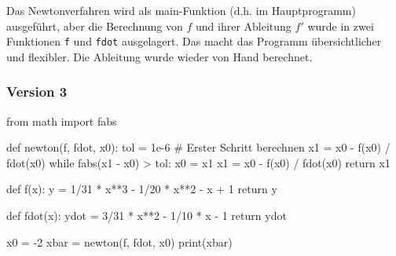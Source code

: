 \documentclass[
  letterpaper,
  DIV=11,
  oneside]{scrreprt}
\newenvironment{Shaded}{\begin{snugshade}}{\end{snugshade}}
\newcommand{\BuiltInTok}[1]{\textcolor[rgb]{0.00,0.23,0.31}{#1}}
\newcommand{\CommentTok}[1]{\textcolor[rgb]{0.37,0.37,0.37}{#1}}
\newcommand{\ControlFlowTok}[1]{\textcolor[rgb]{0.00,0.23,0.31}{#1}}
\newcommand{\DecValTok}[1]{\textcolor[rgb]{0.68,0.00,0.00}{#1}}
\newcommand{\FloatTok}[1]{\textcolor[rgb]{0.68,0.00,0.00}{#1}}
\newcommand{\ImportTok}[1]{\textcolor[rgb]{0.00,0.46,0.62}{#1}}
\newcommand{\KeywordTok}[1]{\textcolor[rgb]{0.00,0.23,0.31}{#1}}
\newcommand{\NormalTok}[1]{\textcolor[rgb]{0.00,0.23,0.31}{#1}}
\newcommand{\OperatorTok}[1]{\textcolor[rgb]{0.37,0.37,0.37}{#1}}
\theoremstyle{definition}
\theoremstyle{definition}
\theoremstyle{remark}
\begin{document}
\begin{tcolorbox}
Das Newtonverfahren wird als main-Funktion (d.h. im Hauptprogramm)
ausgeführt, aber die Berechnung von \(f\) und ihrer Ableitung \(f'\)
wurde in zwei Funktionen \texttt{f} und \texttt{fdot} ausgelagert. Das
macht das Programm übersichtlicher und flexibler. Die Ableitung wurde
wieder von Hand berechnet.

\hypertarget{version-3}{%
\subsubsection{Version 3}\label{version-3}}

\begin{Shaded}
\begin{Highlighting}[]
\ImportTok{from}\NormalTok{ math }\ImportTok{import}\NormalTok{ fabs}

\KeywordTok{def}\NormalTok{ newton(f, fdot, x0):}
\NormalTok{    tol }\OperatorTok{=} \FloatTok{1e{-}6}
    \CommentTok{\# Erster Schritt berechnen}
\NormalTok{    x1 }\OperatorTok{=}\NormalTok{ x0 }\OperatorTok{{-}}\NormalTok{ f(x0) }\OperatorTok{/}\NormalTok{ fdot(x0)}
    \ControlFlowTok{while}\NormalTok{ fabs(x1 }\OperatorTok{{-}}\NormalTok{ x0) }\OperatorTok{\textgreater{}}\NormalTok{ tol:}
\NormalTok{        x0 }\OperatorTok{=}\NormalTok{ x1}
\NormalTok{        x1 }\OperatorTok{=}\NormalTok{ x0 }\OperatorTok{{-}}\NormalTok{ f(x0) }\OperatorTok{/}\NormalTok{ fdot(x0)}
    \ControlFlowTok{return}\NormalTok{ x1}

\KeywordTok{def}\NormalTok{ f(x):}
\NormalTok{    y }\OperatorTok{=} \DecValTok{1}\OperatorTok{/}\DecValTok{31} \OperatorTok{*}\NormalTok{ x}\OperatorTok{**}\DecValTok{3} \OperatorTok{{-}} \DecValTok{1}\OperatorTok{/}\DecValTok{20} \OperatorTok{*}\NormalTok{ x}\OperatorTok{**}\DecValTok{2} \OperatorTok{{-}}\NormalTok{ x }\OperatorTok{+} \DecValTok{1}
    \ControlFlowTok{return}\NormalTok{ y}

\KeywordTok{def}\NormalTok{ fdot(x):}
\NormalTok{    ydot }\OperatorTok{=} \DecValTok{3}\OperatorTok{/}\DecValTok{31} \OperatorTok{*}\NormalTok{ x}\OperatorTok{**}\DecValTok{2} \OperatorTok{{-}} \DecValTok{1}\OperatorTok{/}\DecValTok{10} \OperatorTok{*}\NormalTok{ x }\OperatorTok{{-}} \DecValTok{1}
    \ControlFlowTok{return}\NormalTok{ ydot}

\NormalTok{x0 }\OperatorTok{=} \OperatorTok{{-}}\DecValTok{2}
\NormalTok{xbar }\OperatorTok{=}\NormalTok{ newton(f, fdot, x0)}
\BuiltInTok{print}\NormalTok{(xbar)}
\end{Highlighting}
\end{Shaded}


\end{tcolorbox}
\end{document}
